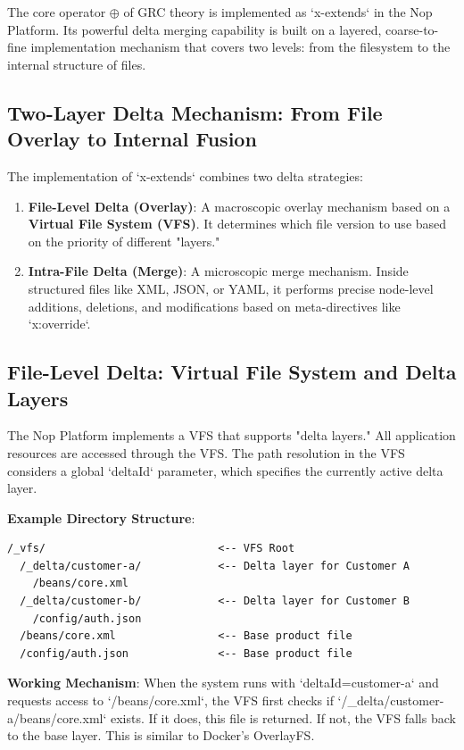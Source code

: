 \documentclass[11pt]{article}
\begin{document}
The core operator $\oplus$ of GRC theory is implemented as `x-extends` in the Nop Platform. Its powerful delta merging capability is built on a layered, coarse-to-fine implementation mechanism that covers two levels: from the filesystem to the internal structure of files.

\subsection{Two-Layer Delta Mechanism: From File Overlay to Internal Fusion}
The implementation of `x-extends` combines two delta strategies:
\begin{enumerate}
    \item \textbf{File-Level Delta (Overlay)}: A macroscopic overlay mechanism based on a \textbf{Virtual File System (VFS)}. It determines which file version to use based on the priority of different "layers."
    \item \textbf{Intra-File Delta (Merge)}: A microscopic merge mechanism. Inside structured files like XML, JSON, or YAML, it performs precise node-level additions, deletions, and modifications based on meta-directives like `x:override`.
\end{enumerate}

\subsection{File-Level Delta: Virtual File System and Delta Layers}
The Nop Platform implements a VFS that supports "delta layers." All application resources are accessed through the VFS. The path resolution in the VFS considers a global `deltaId` parameter, which specifies the currently active delta layer.

\textbf{Example Directory Structure}:
\begin{verbatim}
/_vfs/                           <-- VFS Root
  /_delta/customer-a/            <-- Delta layer for Customer A
    /beans/core.xml
  /_delta/customer-b/            <-- Delta layer for Customer B
    /config/auth.json
  /beans/core.xml                <-- Base product file
  /config/auth.json              <-- Base product file
\end{verbatim}

\textbf{Working Mechanism}:
When the system runs with `deltaId=customer-a` and requests access to `/beans/core.xml`, the VFS first checks if `/\_delta/customer-a/beans/core.xml` exists. If it does, this file is returned. If not, the VFS falls back to the base layer. This is similar to Docker's OverlayFS.
\end{document}
